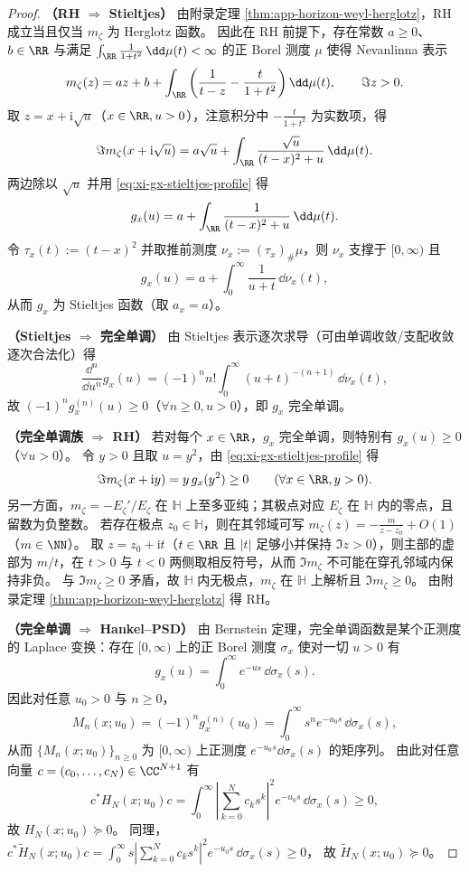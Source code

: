 \begin{proof}
\textbf{（RH \(\Rightarrow\) Stieltjes）}
由附录定理 \ref{thm:app-horizon-weyl-herglotz}，RH 成立当且仅当 \(m_{\zeta}\) 为 Herglotz 函数。
因此在 RH 前提下，存在常数 \(a\ge 0\)、\(b\in\RR\) 与满足 \(\int_{\RR}\frac{1}{1+t^2}\,\dd\mu(t)<\infty\) 的正 Borel 测度 \(\mu\) 使得 Nevanlinna 表示
\[
m_{\zeta}(z)=az+b+\int_{\RR}\left(\frac{1}{t-z}-\frac{t}{1+t^2}\right)\dd\mu(t),
\qquad \Im z>0.
\]
取 \(z=x+\mathrm{i}\sqrt{u}\)（\(x\in\RR,u>0\)），注意积分中 \(-\frac{t}{1+t^2}\) 为实数项，得
\[
\Im m_{\zeta}(x+\mathrm{i}\sqrt{u})
=a\sqrt{u}+\int_{\RR}\frac{\sqrt{u}}{(t-x)^2+u}\,\dd\mu(t).
\]
两边除以 \(\sqrt{u}\) 并用 \eqref{eq:xi-gx-stieltjes-profile} 得
\[
g_x(u)=a+\int_{\RR}\frac{1}{(t-x)^2+u}\,\dd\mu(t).
\]
令 \(\tau_x(t):=(t-x)^2\) 并取推前测度 \(\nu_x:=(\tau_x)_\#\mu\)，则 \(\nu_x\) 支撑于 \([0,\infty)\) 且
\[
g_x(u)=a+\int_{0}^{\infty}\frac{1}{u+t}\,\dd\nu_x(t),
\]
从而 \(g_x\) 为 Stieltjes 函数（取 \(a_x=a\)）。\par

\textbf{（Stieltjes \(\Rightarrow\) 完全单调）}
由 Stieltjes 表示逐次求导（可由单调收敛/支配收敛逐次合法化）得
\[
\frac{\dd^n}{\dd u^n}g_x(u)=(-1)^n n!\int_{0}^{\infty}(u+t)^{-(n+1)}\,\dd\nu_x(t),
\]
故 \((-1)^n g_x^{(n)}(u)\ge 0\)（\(\forall n\ge 0,u>0\)），即 \(g_x\) 完全单调。 \par

\textbf{（完全单调族 \(\Rightarrow\) RH）}
若对每个 \(x\in\RR\)，\(g_x\) 完全单调，则特别有 \(g_x(u)\ge 0\)（\(\forall u>0\)）。
令 \(y>0\) 且取 \(u=y^2\)，由 \eqref{eq:xi-gx-stieltjes-profile} 得
\[
\Im m_{\zeta}(x+\mathrm{i}y)=y\,g_x(y^2)\ge 0\qquad(\forall x\in\RR,y>0).
\]
另一方面，\(m_{\zeta}=-E_{\zeta}'/E_{\zeta}\) 在 \(\mathbb{H}\) 上至多亚纯；其极点对应 \(E_{\zeta}\) 在 \(\mathbb{H}\) 内的零点，且留数为负整数。
若存在极点 \(z_0\in\mathbb{H}\)，则在其邻域可写
\(
m_{\zeta}(z)=-\frac{m}{z-z_0}+O(1)
\)
（\(m\in\NN\)）。
取 \(z=z_0+\mathrm{i}t\)（\(t\in\RR\) 且 \(|t|\) 足够小并保持 \(\Im z>0\)），则主部的虚部为 \(m/t\)，在 \(t>0\) 与 \(t<0\) 两侧取相反符号，从而 \(\Im m_{\zeta}\) 不可能在穿孔邻域内保持非负。
与 \(\Im m_{\zeta}\ge 0\) 矛盾，故 \(\mathbb{H}\) 内无极点，\(m_{\zeta}\) 在 \(\mathbb{H}\) 上解析且 \(\Im m_{\zeta}\ge 0\)。
由附录定理 \ref{thm:app-horizon-weyl-herglotz} 得 RH。 \par

\textbf{（完全单调 \(\Rightarrow\) Hankel--PSD）}
由 Bernstein 定理，完全单调函数是某个正测度的 Laplace 变换：存在 \([0,\infty)\) 上的正 Borel 测度 \(\sigma_x\) 使对一切 \(u>0\) 有
\[
g_x(u)=\int_{0}^{\infty}e^{-us}\,\dd\sigma_x(s).
\]
因此对任意 \(u_0>0\) 与 \(n\ge 0\)，
\[
M_n(x;u_0)=(-1)^n g_x^{(n)}(u_0)=\int_{0}^{\infty}s^n e^{-u_0 s}\,\dd\sigma_x(s),
\]
从而 \(\{M_n(x;u_0)\}_{n\ge 0}\) 为 \([0,\infty)\) 上正测度 \(e^{-u_0 s}\dd\sigma_x(s)\) 的矩序列。
由此对任意向量 \(c=(c_0,\dots,c_N)\in\CC^{N+1}\) 有
\[
c^\ast H_N(x;u_0)c
=\int_0^\infty\left|\sum_{k=0}^{N}c_k s^k\right|^2 e^{-u_0 s}\,\dd\sigma_x(s)\ge 0,
\]
故 \(H_N(x;u_0)\succeq 0\)。
同理，
\(
c^\ast \widetilde H_N(x;u_0)c
=\int_0^\infty s\left|\sum_{k=0}^{N}c_k s^k\right|^2 e^{-u_0 s}\,\dd\sigma_x(s)\ge 0
\)，
故 \(\widetilde H_N(x;u_0)\succeq 0\)。\par


\end{proof}
